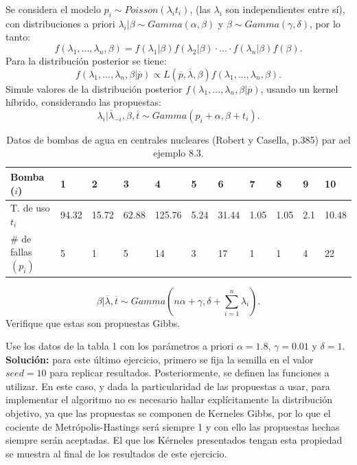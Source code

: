 \documentclass[letterpaper]{article}
\newcommand{\1}{\mathds{1}}
\theoremstyle{definition}
\theoremstyle{definition}
\theoremstyle{definition}
\theoremstyle{definition}
\theoremstyle{definition}
\begin{document}
\begin{itemize}
    Se considera el modelo $p_i\sim Poisson(\lambda_it_i)$, (las $\lambda_i$ son independientes entre sí), con 
    distribuciones a priori $\lambda_i|\beta \sim Gamma(\alpha,\beta)$ y $\beta\sim Gamma(\gamma, \delta)$, por lo tanto:
    \[
    f(\lambda_1,...,\lambda_n,\beta)=f(\lambda_1|\beta)f(\lambda_2|\beta)\cdot...\cdot f(\lambda_n|\beta)f(\beta).    
    \]
    Para la distribución posterior se tiene:
    \[
    f(\lambda_1,...,\lambda_n,\beta|\overline{p})\propto L(\overline{p},\overline{\lambda},\beta)f(\lambda_1,...,\lambda_n,\beta).    
    \]
    Simule valores de la distribución posterior $f(\lambda_1,...,\lambda_n,\beta|\overline{p})$, usando un 
    kernel híbrido, considerando las propuestas:
    \[
    \lambda_i|\overline{\lambda}_{-i},\beta,\overline{t} \sim Gamma(p_i+\alpha,\beta+t_i).    
    \]
    \begin{table}[]
        \begin{tabular}{|l|l|l|l|l|l|l|l|l|l|l|}
        \hline
        Bomba ($i$)          & 1     & 2     & 3     & 4      & 5    & 6     & 7    & 8    & 9   & 10    \\ \hline
        T. de uso $t_i$      & 94.32 & 15.72 & 62.88 & 125.76 & 5.24 & 31.44 & 1.05 & 1.05 & 2.1 & 10.48 \\
        \# de fallas $(p_i)$ & 5     & 1     & 5     & 14     & 3    & 17    & 1    & 1    & 4   & 22    \\ \hline
        \end{tabular}
        \caption{Datos de bombas de agua en centrales nucleares (Robert y Casella, p.385) par ael ejemplo 8.3.}
    \end{table}
    \[
    \beta|\overline{\lambda},\overline{t}\sim Gamma\left(n\alpha+\gamma,\delta+\sum_{i=1}^{n}\lambda_i\right).
    \]
    Verifique que estas son propuestas Gibbs.

    Use los datos de la tabla 1 con los parámetros a priori $\alpha=1.8$, $\gamma=0.01$ y $\delta=1$.\\

    \textbf{Solución:} para este último ejercicio, primero se fija la semilla en el valor $seed=10$ para replicar resultados. Posteriormente, 
    se definen las funciones a utilizar. En este caso, y dada la particularidad de las propuestas a usar, para implementar
    el algoritmo no es necesario hallar explícitamente la distribución objetivo, ya que las propuestas 
    se componen de Kerneles Gibbs, por lo que el cociente de Metrópolis-Hastings será siempre 1 
    y con ello las propuestas hechas siempre serán aceptadas. El que los Kérneles presentados tengan 
    esta propiedad se muestra al final de los resultados de este ejercicio.
    \newline


\end{itemize}
\end{document}
